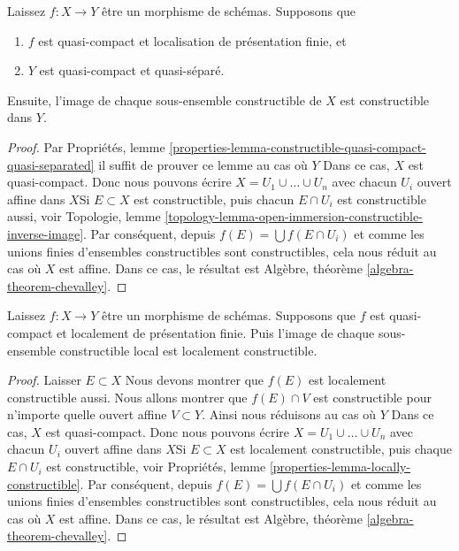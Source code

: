 \begin{lemma}

\label{lemma-chevalley}
Laissez $f : X \to Y$ être un morphisme de schémas. Supposons que
\begin{enumerate}
\item $f$ est quasi-compact et localisation de présentation finie, et
\item $Y$ est quasi-compact et quasi-séparé.
\end{enumerate}
Ensuite, l'image de chaque sous-ensemble constructible de $X$ est constructible dans $Y$.
\end{lemma}

\begin{proof}

Par Propriétés, lemme \ref{properties-lemma-constructible-quasi-compact-quasi-separated}
il suffit de prouver ce lemme au cas où $Y$ Dans ce cas, $X$ est quasi-compact. Donc nous pouvons écrire
$X = U_1 \cup \ldots \cup U_n$ avec chacun $U_i$ ouvert affine dans $X$Si $E \subset X$ est constructible, puis chacun $E \cap U_i$ est constructible aussi, voir Topologie, lemme \ref{topology-lemma-open-immersion-constructible-inverse-image}. Par conséquent, depuis $f(E) = \bigcup f(E \cap U_i)$ et comme les unions finies d'ensembles constructibles sont constructibles, cela nous réduit au cas où
$X$ est affine. Dans ce cas, le résultat est Algèbre, théorème \ref{algebra-theorem-chevalley}.

\end{proof}

\begin{theorem}
\label{theorem-chevalley}

\begin{reference}
\cite[IV, théorème 1.8.4]{EGA}
\end{reference}
Laissez $f : X \to Y$ être un morphisme de schémas. Supposons que $f$ est quasi-compact et localement de présentation finie. Puis l'image de chaque sous-ensemble constructible local est localement constructible.
\end{theorem}

\begin{proof}

Laisser $E \subset X$ Nous devons montrer que $f(E)$ est localement constructible aussi. Nous allons montrer que $f(E) \cap V$ est constructible pour n'importe quelle ouvert affine $V \subset Y$. Ainsi nous réduisons au cas où $Y$ Dans ce cas, $X$ est quasi-compact. Donc nous pouvons écrire
$X = U_1 \cup \ldots \cup U_n$ avec chacun $U_i$ ouvert affine dans $X$Si $E \subset X$ est localement constructible, puis chaque $E \cap U_i$
est constructible, voir Propriétés, lemme \ref{properties-lemma-locally-constructible}. Par conséquent, depuis $f(E) = \bigcup f(E \cap U_i)$ et comme les unions finies d'ensembles constructibles sont constructibles, cela nous réduit au cas où $X$
est affine. Dans ce cas, le résultat est Algèbre, théorème \ref{algebra-theorem-chevalley}.

\end{proof}

